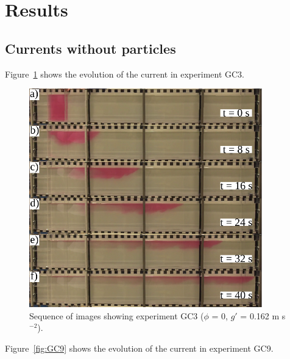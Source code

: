 \documentclass[authoryear,preprint,review,12pt]{elsarticle}
\begin{document}
\section{Results}
\label{sec:res}

\subsection{Currents without particles}
\label{subsec:res_no_parts}

Figure~\ref{fig:GC3} shows the evolution of the current in experiment GC3.

\begin{figure}[ht!]
  \centerline{\includegraphics[width=0.9\textwidth]{GC3.pdf}}
  \caption{Sequence of images showing experiment GC3 ($\phi$ = 0, $g\prime$ = 0.162 m s$^{-2}$). }
  \label{fig:GC3}
\end{figure}

Figure~\ref{fig:GC9} shows the evolution of the current in experiment GC9.
\end{document}

